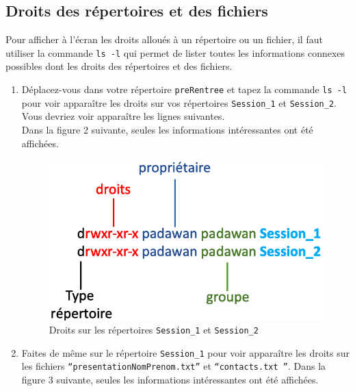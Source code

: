 \documentclass{article}
\begin{document}
\hypertarget{droits-des-répertoires-et-des-fichiers}{%
\subsection{Droits des répertoires et des fichiers}\label{droits-des-répertoires-et-des-fichiers}}

\begin{exercice}

Pour afficher à l'écran les droits alloués à un répertoire ou un fichier, il faut utiliser la commande \texttt{ls -l} qui permet de lister toutes les 
informations connexes possibles dont les droits des répertoires et des fichiers. 

\begin{enumerate}

\item
Déplacez-vous dans votre répertoire \texttt{preRentree} et tapez la commande \texttt{ls -l} pour voir apparaître les droits sur vos répertoires \texttt{Session\_1} et \texttt{Session\_2}. 
Vous devriez voir apparaître les lignes suivantes.\\
Dans la figure 2 suivante, seules les informations intéressantes ont été affichées.

\begin{figure}[h!]
    \begin{center}
    \includegraphics[scale=0.2]{droitsRep.png}
    \caption{Droits sur les répertoires \texttt{Session\_1} et \texttt{Session\_2}}
     \end{center}
\end{figure}    

\medskip

\item
Faites de même sur le répertoire \texttt{Session\_1} pour voir apparaître les droits sur les fichiers \texttt{``presentationNomPrenom.txt''} et \texttt{``contacts.txt ''}.
Dans la figure 3 suivante, seules les informations intéressantes ont été affichées.


\end{enumerate}
\end{exercice}
\end{document}
